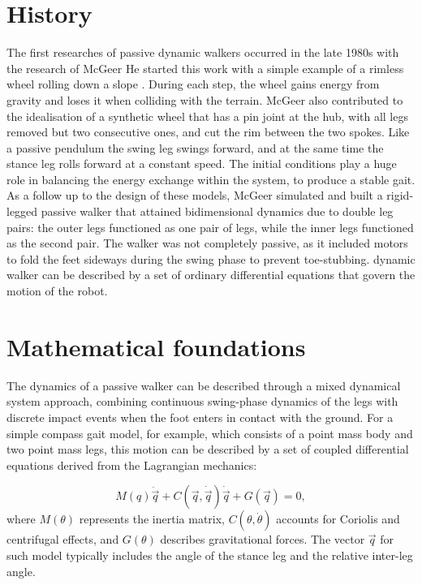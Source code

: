\section{History}
The first researches of passive dynamic walkers occurred in the late 1980s with the research of McGeer \cite{T.McGeer:1989}\cite{T.McGeer:1990a}\cite{T.McGeer:1990b}\cite{T.McGeer:1990c}
He started this work with a simple example of a rimless wheel rolling down a slope \cite{T.McGeer:1990c}. During each step, the wheel gains energy from gravity and loses it when colliding with the terrain. 
McGeer also contributed to the idealisation of a synthetic wheel that has a pin joint at the hub, with all legs removed but two consecutive ones, and cut the rim between the two spokes.
Like a passive pendulum the swing leg swings forward, and at the same time the stance leg rolls forward at a constant speed. 
The initial conditions play a huge role in balancing the energy exchange within the system, to produce a stable gait.
As a follow up to the design of these models, McGeer simulated and built a rigid-legged passive walker that attained bidimensional dynamics due to double leg pairs: the outer legs functioned as one pair of legs, while the inner legs functioned as the second pair.
The walker was not completely passive, as it included motors to fold the feet sideways during the swing phase to prevent toe-stubbing.
dynamic walker can be described by a set of ordinary differential equations that govern the motion of the robot. 

\section{Mathematical foundations}
The dynamics of a passive walker can be described through a mixed dynamical system approach, combining continuous swing-phase dynamics of the legs with discrete impact events when the foot enters in contact with the ground.
For a simple compass gait model, for example, which consists of a point mass body and two point mass legs, this motion can be described by a set of coupled differential equations derived from the Lagrangian mechanics:

\begin{equation}
    M(q)\ddot{\vec{q}} + C(\vec{q}, \dot{\vec{q}})\dot{\vec{q}} + G(\vec{q}) = 0,
\end{equation}
where $M(\theta)$ represents the inertia matrix, $C(\theta, \dot{\theta})$ accounts for Coriolis and centrifugal effects, and $G(\theta)$ describes gravitational forces.
The vector $\vec{q}$ for such model typically includes the angle of the stance leg and the relative inter-leg angle.


